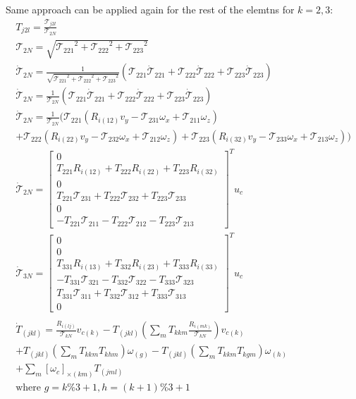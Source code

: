Same approach can be applied again for the rest of the elemtns for $k= 2,3$:
\begin{equation}
  \begin{gathered}
    T_{j2l} = \frac{\mathcal{T}_{j2l}}{\mathcal{T}_{2N}}\\
    \mathcal{T}_{2N} = \sqrt{{\mathcal{T}_{221}}^{2}+{\mathcal{T}_{222}}^{2}+{\mathcal{T}_{223}}^{2}}\\
    \dot{\mathcal{T}}_{2N} = \frac{1}{\sqrt{{\mathcal{T}_{221}}^{2}+{\mathcal{T}_{222}}^{2}+{\mathcal{T}_{223}}^{2}}}(\mathcal{T}_{221}\dot{\mathcal{T}}_{221} + \mathcal{T}_{222}\dot{\mathcal{T}}_{222} + \mathcal{T}_{223}\dot{\mathcal{T}}_{223})\\
    \dot{\mathcal{T}}_{2N} = \frac{1}{\mathcal{T}_{2N}}(\mathcal{T}_{221}\dot{\mathcal{T}}_{221} + \mathcal{T}_{222}\dot{\mathcal{T}}_{222} + \mathcal{T}_{223}\dot{\mathcal{T}}_{223})\\
    \dot{\mathcal{T}}_{2N} = \frac{1}{\mathcal{T}_{2N}}(\mathcal{T}_{221}(R_{i(12)} v_y - \mathcal{T}_{231} \omega_x + \mathcal{T}_{211} \omega_z) \\+ \mathcal{T}_{222}(R_{i(22)} v_y - \mathcal{T}_{232} \omega_x + \mathcal{T}_{212} \omega_z) + \mathcal{T}_{223}(R_{i(32)} v_y - \mathcal{T}_{233} \omega_x + \mathcal{T}_{213} \omega_z))\\
  \dot{\mathcal{T}}_{2N} = \begin{bmatrix}0 \\ T_{221}R_{i(12)} + T_{222}R_{i(22)} + T_{223}R_{i(32)} \\ 0 \\  T_{221}\mathcal{T}_{231} + T_{222}\mathcal{T}_{232} + T_{223}\mathcal{T}_{233} \\ 0 \\ -T_{221}\mathcal{T}_{211} - T_{222}\mathcal{T}_{212} - T_{223}\mathcal{T}_{213}\end{bmatrix}^{T} u_c\\
    \dot{\mathcal{T}}_{3N} = \begin{bmatrix}0 \\ 0 \\ T_{331}R_{i(13)} + T_{332}R_{i(23)} + T_{333}R_{i(33)} \\  -T_{331}\mathcal{T}_{321} - T_{332}\mathcal{T}_{322} - T_{333}\mathcal{T}_{323} \\ T_{331}\mathcal{T}_{311} + T_{332}\mathcal{T}_{312} + T_{333}\mathcal{T}_{313} \\ 0\end{bmatrix}^{T} u_c\\
    \\
    \dot{T}_{(jkl)} = \frac{R_{i(lj)}}{\mathcal{T}_{kN}}v_{c(k)} -T_{(jkl)}(\sum_{m}T_{kkm}\frac{R_{i(mk)}}{\mathcal{T}_{kN}}) v_{c(k)}\\ + T_{(jkl)}(\sum_{m}T_{kkm}T_{khm})\omega_{(g)} - T_{(jkl)}(\sum_{m}T_{kkm}T_{kgm})\omega_{(h)} \\+\sum_{m} {[\omega_{c}]}_{\times(km)} T_{(jml)}\\
      \text{where } g = k\%3 +1, h = (k+1)\%3 +1
  \end{gathered}\label{eq:tensornormalizationk23}
\end{equation}

